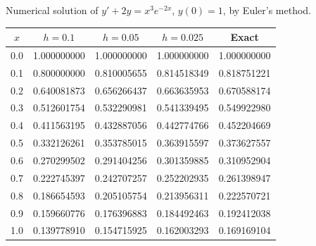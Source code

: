 \begin{examplesolution}
\begin{newtable}
  \label{table:3.1.1} Numerical solution of $y'+2y=x^{3}e^{-2x}$, $y(0)=1$, by Euler's method.
  \begin{center}
    \begin{tabular}{|c|r|r|r|r|}
      \hline
      \multicolumn{1}{|c|}{$x$} & \multicolumn{1}{|c|}{$h=0.1$} & \multicolumn{1}{|c|}{$h=0.05$} & \multicolumn{1}{|c|}{$h=0.025$} & \multicolumn{1}{|c|}{Exact} \\
      \hline
      0.0                       & 1.000000000                   & 1.000000000                    & 1.000000000                     & 1.000000000                 \\
      0.1                       & 0.800000000                   & 0.810005655                    & 0.814518349                     & 0.818751221                 \\
      0.2                       & 0.640081873                   & 0.656266437                    & 0.663635953                     & 0.670588174                 \\
      0.3                       & 0.512601754                   & 0.532290981                    & 0.541339495                     & 0.549922980                 \\
      0.4                       & 0.411563195                   & 0.432887056                    & 0.442774766                     & 0.452204669                 \\
      0.5                       & 0.332126261                   & 0.353785015                    & 0.363915597                     & 0.373627557                 \\
      0.6                       & 0.270299502                   & 0.291404256                    & 0.301359885                     & 0.310952904                 \\
      0.7                       & 0.222745397                   & 0.242707257                    & 0.252202935                     & 0.261398947                 \\
      0.8                       & 0.186654593                   & 0.205105754                    & 0.213956311                     & 0.222570721                 \\
      0.9                       & 0.159660776                   & 0.176396883                    & 0.184492463                     & 0.192412038                 \\
      1.0                       & 0.139778910                   & 0.154715925                    & 0.162003293                     & 0.169169104                 \\
      \hline
    \end{tabular}
  \end{center}
\end{newtable}


\end{examplesolution}
